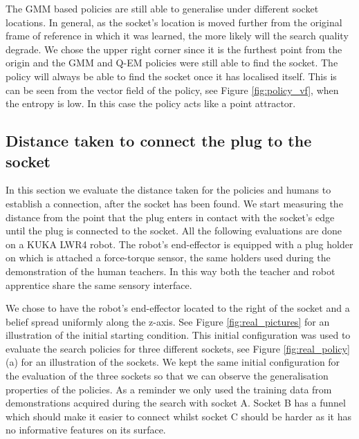 The GMM based policies are still able to generalise under different socket locations. In general, as the socket's location is moved 
further from the original frame of reference in which it was learned, the more likely will the search quality degrade. We 
chose the upper right corner since it is the furthest point from the origin and the GMM and Q-EM policies were still able to find 
the socket. The policy will always be able to find the socket once it has localised itself. This is can be seen from the vector field 
of the policy, see Figure \ref{fig:policy_vf}, when the entropy is low. In this case the policy acts like a point attractor.

\subsection{Distance taken to connect the plug to the socket}
In this section we evaluate the distance taken for the policies and humans to establish a connection, after the socket 
has been found. We start measuring the distance 
from the point that the plug enters in contact with the socket's edge until the plug is connected to the socket. All the following evaluations are done 
on a KUKA LWR4 robot. The robot's end-effector is equipped with a plug holder on which is attached a force-torque sensor, 
the same holders used during the demonstration of the human teachers. In this way both the teacher and robot apprentice share 
the same sensory interface.

We chose to have the robot's end-effector located to the right of the socket and a belief spread uniformly 
along the z-axis. See Figure \ref{fig:real_pictures} for an illustration of the initial starting condition.
This initial configuration was used to evaluate the search policies for three different sockets, see Figure \ref{fig:real_policy} (a) for 
an illustration of the sockets. We kept the same initial configuration for the evaluation of the three sockets so that 
we can observe the generalisation properties of the policies. As a reminder we only used the training data 
from demonstrations acquired during the search with socket A. Socket B has a funnel which should make it 
easier to connect whilst socket C should be harder as it has no informative features on its surface. 


